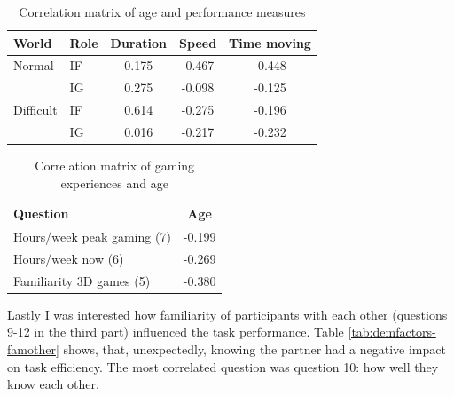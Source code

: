 \begin{table}[!htbp]
 \centering
\begin{tabular}{llccc}
\toprule
World & Role  & Duration & Speed & Time moving  \\
\midrule
Normal 	& IF & 0.175 & -0.467 & -0.448\\
 		& IG & 0.275 & -0.098 & -0.125\\
\midrule
Difficult& IF & 0.614 &	-0.275 &-0.196\\
 		& IG  & 0.016 &	-0.217 &-0.232\\
\bottomrule
\end{tabular}
\caption{Correlation matrix of age and performance measures}
\label{tab:demfactors-age}
\end{table}


\begin{table}[!htbp]
 \centering
\begin{tabular}{lc}
\toprule
 Question  & Age\\
\midrule
Hours/week peak gaming (7) 	& -0.199 \\
Hours/week now 	(6)			& -0.269	\\
Familiarity 3D games (5)	& -0.380	 \\ 
\bottomrule
\end{tabular}
\caption{Correlation matrix of gaming experiences and age}
\label{tab:demfactors-gaming-age}
\end{table}

Lastly I was interested how familiarity of participants with each other (questions 9-12 in the third part) influenced the task performance. Table \ref{tab:demfactors-famother} shows, that, unexpectedly, knowing the partner had a negative impact on task efficiency. The most correlated question was question 10: how well they know each other.

